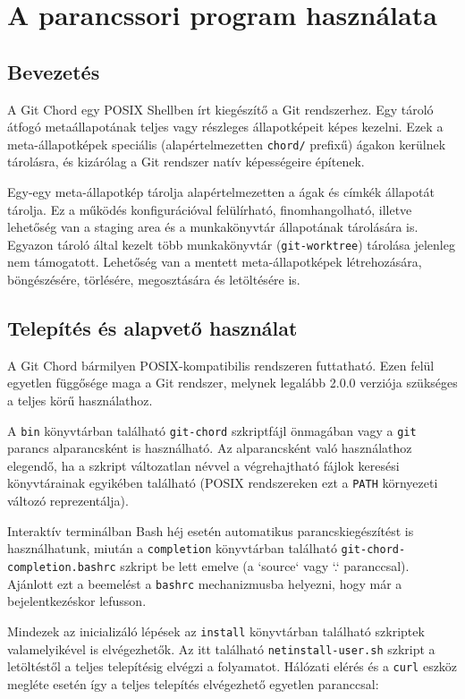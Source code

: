 \documentclass[
]{elteikthesis}[2025/03/25]
\begin{document}
\section{A parancssori program használata}

\subsection{Bevezetés}

A Git Chord egy POSIX Shellben írt kiegészítő a Git rendszerhez.
Egy tároló átfogó metaállapotának teljes vagy részleges állapotképeit képes kezelni.
Ezek a meta-állapotképek speciális (alapértelmezetten \texttt{chord/} prefixű) ágakon kerülnek tárolásra,
és kizárólag a Git rendszer natív képességeire építenek.

Egy-egy meta-állapotkép tárolja alapértelmezetten a ágak és címkék állapotát tárolja.
Ez a működés konfigurációval felülírható, finomhangolható,
illetve lehetőség van a staging area és a munkakönyvtár állapotának tárolására is.
Egyazon tároló által kezelt több munkakönyvtár (\texttt{git-worktree}) tárolása jelenleg nem támogatott.
Lehetőség van a mentett meta-állapotképek létrehozására, böngészésére, törlésére, megosztására és letöltésére is.

\subsection{Telepítés és alapvető használat}

A Git Chord bármilyen POSIX-kompatibilis rendszeren futtatható.
Ezen felül egyetlen függősége maga a Git rendszer,
melynek legalább 2.0.0 verziója szükséges a teljes körű használathoz.

A \texttt{bin} könyvtárban található \texttt{git-chord} szkriptfájl önmagában vagy a \texttt{git} parancs alparancsként is használható.
Az alparancsként való használathoz elegendő, ha a szkript változatlan névvel a végrehajtható fájlok keresési könyvtárainak egyikében található (POSIX rendszereken ezt a \texttt{PATH} környezeti változó reprezentálja).

Interaktív terminálban Bash héj esetén automatikus parancskiegészítést is használhatunk,
miután a \texttt{completion} könyvtárban található \texttt{git-chord-completion.bashrc} szkript be lett emelve (a `source` vagy `.` paranccsal).
Ajánlott ezt a beemelést a \texttt{bashrc} mechanizmusba helyezni,
hogy már a bejelentkezéskor lefusson.

Mindezek az inicializáló lépések az \texttt{install} könyvtárban található szkriptek valamelyikével is elvégezhetők.
Az itt található \texttt{netinstall-user.sh} szkript a letöltéstől a teljes telepítésig elvégzi a folyamatot.
Hálózati elérés és a \texttt{curl} eszköz megléte esetén így a teljes telepítés elvégezhető egyetlen paranccsal:
\end{document}
